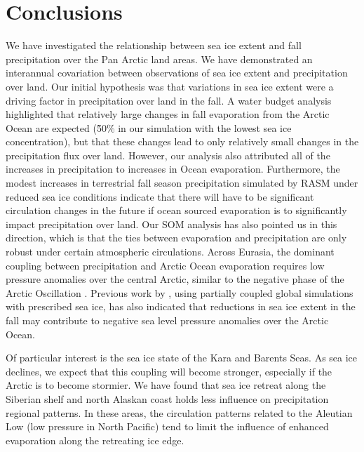 \section{Conclusions}
\label{sec:conclusions_ch5}
We have investigated the relationship between sea ice extent and fall precipitation over the Pan Arctic land areas.
We have demonstrated an interannual covariation between observations of sea ice extent and precipitation over land.
Our initial hypothesis was that variations in sea ice extent were a driving factor in precipitation over land in the fall.
A water budget analysis highlighted that relatively large changes in fall evaporation from the Arctic Ocean are expected (\~50\% in our simulation with the lowest sea ice concentration), but that these changes lead to only relatively small changes in the precipitation flux over land.
However, our analysis also attributed all of the increases in precipitation to increases in Ocean evaporation.
Furthermore, the modest increases in terrestrial fall season precipitation simulated by RASM under reduced sea ice conditions indicate that there will have to be significant circulation changes in the future if ocean sourced evaporation is to significantly impact precipitation over land.
Our SOM analysis has also pointed us in this direction, which is that the ties between evaporation and precipitation are only robust under certain atmospheric circulations.
Across Eurasia, the dominant coupling between precipitation and Arctic Ocean evaporation requires low pressure anomalies over the central Arctic, similar to the negative phase of the Arctic Oscillation \citep{Thompson_1998}.
Previous work by \citet{Cassano_2014}, using partially coupled global simulations with prescribed sea ice, has also indicated that reductions in sea ice extent in the fall may contribute to negative sea level pressure anomalies over the Arctic Ocean.

Of particular interest is the sea ice state of the Kara and Barents Seas.
As sea ice declines, we expect that this coupling will become stronger, especially if the Arctic is to become stormier.
We have found that sea ice retreat along the Siberian shelf and north Alaskan coast  holds less influence on precipitation regional patterns.
In these areas, the circulation patterns related to the Aleutian Low (low pressure in North Pacific) tend to limit the influence of enhanced evaporation along the retreating ice edge.
